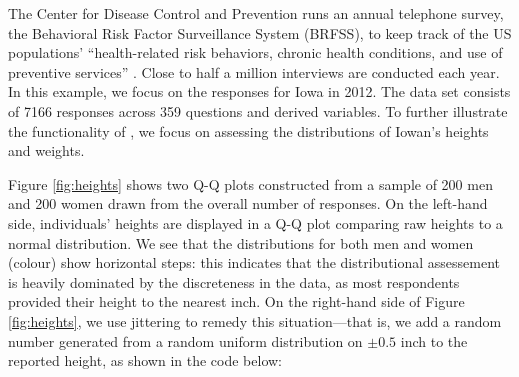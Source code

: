 \label{sec:brfss}

The Center for Disease Control and Prevention runs an annual telephone
survey, the Behavioral Risk Factor Surveillance System (BRFSS), to keep
track of the US populations' ``health-related risk behaviors, chronic
health conditions, and use of preventive services'' \citep{brfss}. Close
to half a million interviews are conducted each year. In this example,
we focus on the responses for Iowa in 2012. The data set consists of
7166 responses across 359 questions and derived variables. To further
illustrate the functionality of , we focus on assessing the
distributions of Iowan's heights and weights.

Figure \ref{fig:heights} shows two Q-Q plots constructed from a sample
of 200 men and 200 women drawn from the overall number of responses. On
the left-hand side, individuals' heights are displayed in a Q-Q plot
comparing raw heights to a normal distribution. We see that the
distributions for both men and women (colour) show horizontal steps:
this indicates that the distributional assessement is heavily dominated
by the discreteness in the data, as most respondents provided their
height to the nearest inch. On the right-hand side of Figure
\ref{fig:heights}, we use jittering to remedy this situation---that is,
we add a random number generated from a random uniform distribution on
\(\pm 0.5\) inch to the reported height, as shown in the code below:

